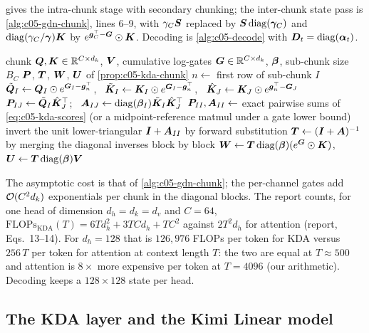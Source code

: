  gives the intra-chunk stage with secondary chunking; the inter-chunk state
pass is \cref{alg:c05-gdn-chunk}, lines 6--9, with $\gamma_C\bm{S}$ replaced by
$\bm{S}\operatorname{diag}(\bm\gamma_C)$ and $\operatorname{diag}(\gamma_C/\bm\gamma)\bm{K}$ by $e^{\bm{g}_C^{\top}-\bm{G}}\odot\bm{K}$. Decoding is
\cref{alg:c05-decode} with $\bm{D}_t = \operatorname{diag}(\bm{\alpha}_t)$.

\begin{algorithm}[t]
\caption{KDA intra-chunk stage with secondary chunking (one chunk, one head)}
\label{alg:c05-kda-intra}
\begin{algorithmic}[1]
\Require chunk $\bm{Q},\bm{K} \in \mathbb{R}^{C\times d_k}$, $\bm{V}$, cumulative log-gates $\bm{G} \in \mathbb{R}^{C\times d_k}$,
  $\bm{\beta}$, sub-chunk size $B_C$
\Ensure $\bm{P}$, $\bm{T}$, $\bm{W}$, $\bm{U}$ of \cref{prop:c05-kda-chunk}
 
  \State $n \gets$ first row of sub-chunk $I$
  \State $\tilde{\bm{Q}}_I \gets \bm{Q}_I\odot e^{\bm{G}_I - \bm{g}_n^{\top}}$, \
         $\tilde{\bm{K}}_I \gets \bm{K}_I\odot e^{\bm{G}_I - \bm{g}_n^{\top}}$, \
         $\hat{\bm{K}}_J \gets \bm{K}_J\odot e^{\bm{g}_n^{\top} - \bm{G}_J}$ 
  \State $\bm{P}_{IJ} \gets \tilde{\bm{Q}}_I\hat{\bm{K}}_J^{\top}$; \ $\bm{A}_{IJ} \gets \operatorname{diag}(\bm{\beta}_I)\tilde{\bm{K}}_I\hat{\bm{K}}_J^{\top}$
\EndFor
\For{each sub-chunk $I$} \Comment{diagonal blocks}
  \State $\bm{P}_{II}, \bm{A}_{II} \gets$ exact pairwise sums of \cref{eq:c05-kda-scores}
         (or a midpoint-reference matmul under a gate lower bound)
  \State invert the unit lower-triangular $\bm{I} + \bm{A}_{II}$ by forward substitution
\EndFor
\State $\bm{T} \gets (\bm{I} + \bm{A})^{-1}$ by merging the diagonal inverses block by block
\State $\bm{W} \gets \bm{T}\operatorname{diag}(\bm{\beta})(e^{\bm{G}}\odot\bm{K})$, \ $\bm{U} \gets \bm{T}\operatorname{diag}(\bm{\beta})\bm{V}$
\end{algorithmic}
\end{algorithm}

The asymptotic cost is that of \cref{alg:c05-gdn-chunk}; the per-channel gates add
$\mathcal{O}(C^2 d_k)$ exponentials per chunk in the diagonal blocks. The report counts, for one head of
dimension $d_h = d_k = d_v$ and $C = 64$,
$\mathrm{FLOPs}_{\mathrm{KDA}}(T) = 6Td_h^2 + 3TCd_h + TC^2$ against $2T^2d_h$ for attention
(report, Eqs.~13--14). For $d_h = 128$ that is $126{,}976$ FLOPs per token for KDA versus $256\,T$
per token for attention at context length $T$: the two are equal at $T \approx 500$ and attention
is $8\times$ more expensive per token at $T = 4096$ (our arithmetic). Decoding keeps a
$128\times128$ state per head.

\subsection{The KDA layer and the Kimi Linear model}\label{sec:c05-kda-model}


